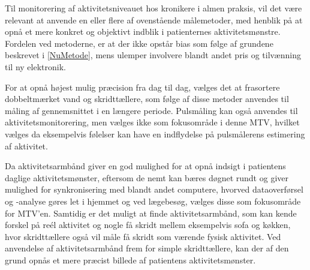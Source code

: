 Til monitorering af aktivitetsniveauet hos kronikere i almen praksis, vil det være relevant at anvende en eller flere af ovenstående målemetoder, med henblik på at opnå et mere konkret og objektivt indblik i patienternes aktivitetsmønstre. Fordelen ved metoderne, er at der ikke opstår bias som følge af grundene beskrevet i \autoref{NuMetode}, mens ulemper involvere blandt andet pris og tilvænning til ny elektronik. 

For at opnå højest mulig præcision fra dag til dag, vælges det at frasortere dobbeltmærket vand og skridttællere, som følge af disse metoder anvendes til måling af gennemsnittet i en længere periode. Pulsmåling kan også anvendes til aktivitetsmonitorering, men vælges ikke som fokusområde i denne MTV, hvilket vælges da eksempelvis følelser kan have en indflydelse på pulsmålerens estimering af aktivitet. 

Da aktivitetsarmbånd giver en god mulighed for at opnå indsigt i patientens daglige aktivitetsmønster, eftersom de nemt kan bæres døgnet rundt og giver mulighed for synkronisering med blandt andet computere, hvorved dataoverførsel og -analyse gøres let i hjemmet og ved lægebesøg, vælges disse som fokusområde for MTV'en. Samtidig er det muligt at finde aktivitetsarmbånd, som kan kende forskel på reél aktivitet og nogle få skridt mellem eksempelvis sofa og køkken, hvor skridttællere også vil måle få skridt som værende fysisk aktivitet. Ved anvendelse af aktivitetsarmbånd frem for simple skridttællere, kan der af den grund opnås et mere præcist billede af patientens aktivitetsmønster.





